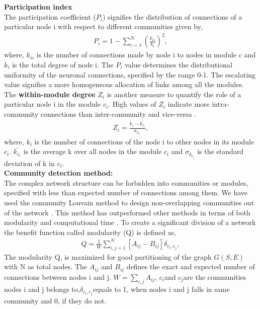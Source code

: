 \documentclass[preprintnumbers,amsmath,amssymb,onecolumn]{revtex4}
\begin{document}
{\noindent}\textbf{Participation index}\\
{\noindent}The participation coefficient ($P_{i}$) signifies the distribution of connections of a particular node i with respect to different communities \citep{Guimera2005} given by,
\begin{eqnarray}
P_{i}=1-\sum_{c=1}^{N}\left(\frac{k_{ic}}{k_{i}}\right)^{2},
\end{eqnarray}
where, $k_{ic}$ is the number of connections made by node i to nodes in module c and $k_{i}$ is the total degree of node i. The $P_{i}$ value determines the distributional uniformity of the neuronal connections, specified by the range 0-1. The escalating value signifies a more homogeneous allocation of links among all the modules.\\

{\noindent}The \textbf{within-module degree} $Z_{i}$ is another measure to quantify the role of a particular node i in the module $c_{i}$. High values of $Z_{i}$ indicate more intra-community connections than inter-community
and vice-versa \citep{Guimera2005}.
\begin{eqnarray}
Z_{i}=\frac{k_{i}-\bar{k_{c_{i}}}}{\sigma_{k_{c_{i}}}},
\end{eqnarray}
where, $k_{i}$ is the number of connections of the node i to other nodes in its module $c_{i}$. $\bar{k_{c_{i}}}$ is the average k over all nodes in the module $c_{i}$ and $\sigma_{k_{c_{i}}}$ is the standard deviation of k in $c_{i}$.\\

\noindent\textbf{Community detection \textbf{method}:}\\
{\noindent}The complex network structure can be forbidden into communities or modules, specified with less than expected number of connections among them. We have used the community Louvain method to design non-overlapping communities out of the network \citep{Blondel2008}. This method has outperformed other methods in terms of both modularity and computational time \citep{Blondel2008}. To create a significant division of a network the benefit function called modularity (Q) is defined as, 
\begin{eqnarray}
Q=\frac{1}{W}\sum_{i,j=1}^{N}[A_{ij}-B_{ij}]\delta_{c_{i},c_{j}},
\end{eqnarray}
The modularity Q, is maximized for good partitioning of the graph $G(S,E)$ with N as total nodes. The $A_{ij}$ and $B_{ij}$ defines the exact and expected number of connections between nodes i and j. $W=\underset{i,j}{\sum}A_{ij}$, $c_{i}$and $c_{j}$are the communities nodes i and j belongs to,$\delta_{c_{i},c_{j}}$equals to 1, when nodes i and j falls in same community and 0, if they do not.
\end{document}
